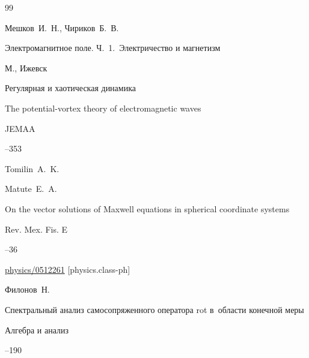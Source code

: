 \begin{thebibliography}{99}

\by Мешков~И.~Н., Чириков~Б.~В.

\book Электромагнитное поле. Ч.~1.~Электричество и магнетизм

\publaddr М., Ижевск

\publ Регулярная и хаотическая динамика






\paper The potential-vortex theory of electromagnetic waves 


\jour JEMAA




--353

\by Tomilin~A.~K. 




\by Matute~E.~A. 

\paper On the vector solutions of Maxwell equations  in spherical coordinate systems

\jour Rev. Mex. Fis. E 



--36


\arxiv \href{http://arxiv.org/abs/physics/0512261}{physics/0512261} [physics.class-ph]






\by Филонов~Н.

\paper Спектральный анализ самосопряженного оператора rot в~области конечной меры

\jour Алгебра и анализ




--190





\end{thebibliography}

